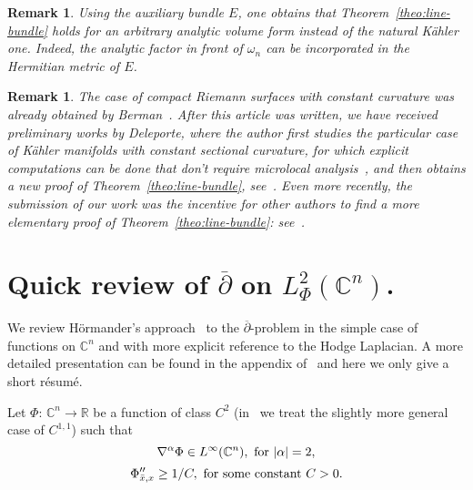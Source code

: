 \documentclass{article}
\newtheorem{remark}[theo]{Remark}
\newcommand{\RM}{\mathbb{R}}
\newcommand{\CM}{\mathbb{C}}
\begin{document}
\begin{remark}
  Using the auxiliary bundle $E$, one obtains that
  Theorem~\ref{theo:line-bundle} holds for an arbitrary analytic
  volume form instead of the natural Kähler one. Indeed, the analytic
  factor in front of $\omega_n$ can be incorporated in the Hermitian
  metric of $E$.
\end{remark}
\begin{remark}
  The case of compact Riemann surfaces with constant curvature was
  already obtained by Berman~\cite{berman12}.  After this article was
  written, we have received preliminary works by Deleporte, where the
  author first studies the particular case of Kähler manifolds with
  constant sectional curvature, for which explicit computations can be
  done that don't require microlocal
  analysis~\cite{deleporte-const-curv18}, and then obtains a new proof
  of Theorem~\ref{theo:line-bundle}, see~\cite{deleporte18}. Even more
  recently, the submission of our work was the incentive for other
  authors to find a more elementary proof of
  Theorem~\ref{theo:line-bundle}: see~\cite{charles2019analytic,
    hezari2019property}.
\end{remark}

\appendix

\section{Quick review of \texorpdfstring{$\overline{\partial }$}{dbar}
  on \texorpdfstring{$L^2_\Phi (\CM^n)$}{L2phi(CN)}.}
\label{app:dbar}

We review Hörmander's approach~\cite{hormander65} to the
$\overline{\partial }$-problem in the simple case of functions on
$\CM^n$ and with more explicit reference to the Hodge Laplacian. A
more detailed presentation can be found in the appendix
of~\cite{sj-96} and here we only give a short r\'esum\'e.

Let $\Phi :\, \CM^n\to \RM$ be a function of class $ C^2$
(in~\cite{sj-96} we treat the slightly more general case of $C^{1,1}$)
such that
\begin{equation}\label{dbar.1}
  \nabla  ^\alpha \Phi \in L^\infty (\CM^n),\hbox{ for }|\alpha |=2,
\end{equation}
\begin{equation}\label{dbar.2}
  \Phi ''_{\bar{x},x}\ge 1/C, \hbox{ for some constant } C>0.
\end{equation}
\end{document}
